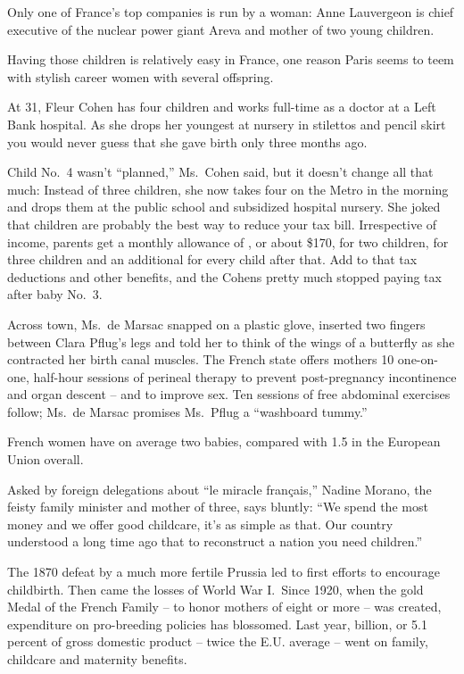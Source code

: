 ﻿\documentclass[12pt]{article}
\begin{document}
Only one of France's top companies is run by a woman: Anne Lauvergeon is chief executive of the
nuclear power giant Areva and mother of two young children.

Having those children is relatively easy in France, one reason Paris seems to teem with stylish
career women with several offspring.

At 31, Fleur Cohen has four children and works full-time as a doctor at a Left Bank hospital. As she
drops her youngest at nursery in stilettos and pencil skirt you would never guess that she gave
birth only three months ago.

Child No.~4 wasn't ``planned,'' Ms.~Cohen said, but it doesn't change all that much: Instead of
three children, she now takes four on the Metro in the morning and drops them at the public school
and subsidized hospital nursery. She joked that children are probably the best way to reduce your
tax bill. Irrespective of income, parents get a monthly allowance of , or about \$170,
for two children,  for three children and an additional  for every child
after that. Add to that tax deductions and other benefits, and the Cohens pretty much stopped paying
tax after baby No.~3.

Across town, Ms.~de Marsac snapped on a plastic glove, inserted two fingers between Clara Pflug's
legs and told her to think of the wings of a butterfly as she contracted her birth canal muscles.
The French state offers mothers 10 one-on-one, half-hour sessions of perineal therapy to prevent
post-pregnancy incontinence and organ descent -- and to improve sex. Ten sessions of free abdominal
exercises follow; Ms.~de Marsac promises Ms.~Pflug a ``washboard tummy.''

French women have on average two babies, compared with 1.5 in the European Union overall.

Asked by foreign delegations about ``le miracle français,'' Nadine Morano, the feisty family
minister and mother of three, says bluntly: ``We spend the most money and we offer good childcare,
it's as simple as that. Our country understood a long time ago that to reconstruct a nation you need
children.''

The 1870 defeat by a much more fertile Prussia led to first efforts to encourage childbirth. Then
came the losses of World War I.~Since 1920, when the gold Medal of the French Family -- to honor
mothers of eight or more -- was created, expenditure on pro-breeding policies has blossomed. Last
year,  billion, or 5.1 percent of gross domestic product -- twice the E.U. average --
went on family, childcare and maternity benefits.
\end{document}
